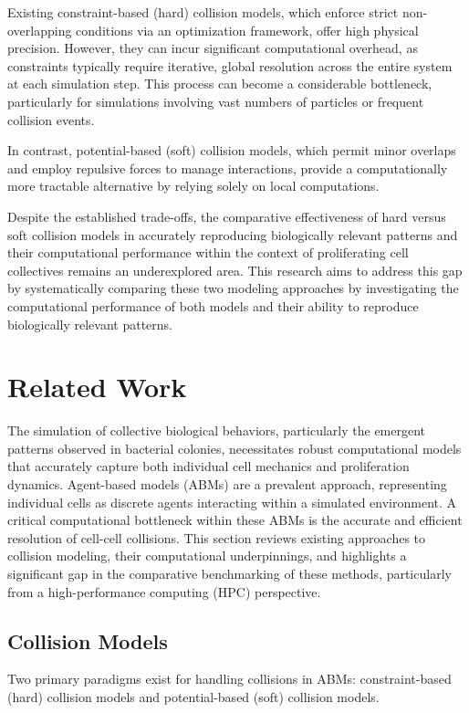 \documentclass[conference]{IEEEtran}
\begin{document}
Existing constraint-based (hard) collision models, which enforce strict non-overlapping conditions via an optimization framework, offer high physical precision. However, they can incur significant computational overhead, as constraints typically require iterative, global resolution across the entire system at each simulation step. This process can become a considerable bottleneck, particularly for simulations involving vast numbers of particles or frequent collision events.

In contrast, potential-based (soft) collision models, which permit minor overlaps and employ repulsive forces to manage interactions, provide a computationally more tractable alternative by relying solely on local computations.

Despite the established trade-offs, the comparative effectiveness of hard versus soft collision models in accurately reproducing biologically relevant patterns and their computational performance within the context of proliferating cell collectives remains an underexplored area. This research aims to address this gap by systematically comparing these two modeling approaches by investigating the computational performance of both models and their ability to reproduce biologically relevant patterns.


\section{Related Work}

The simulation of collective biological behaviors, particularly the emergent patterns observed in bacterial colonies, necessitates robust computational models that accurately capture both individual cell mechanics and proliferation dynamics. Agent-based models (ABMs) are a prevalent approach, representing individual cells as discrete agents interacting within a simulated environment. A critical computational bottleneck within these ABMs is the accurate and efficient resolution of cell-cell collisions. This section reviews existing approaches to collision modeling, their computational underpinnings, and highlights a significant gap in the comparative benchmarking of these methods, particularly from a high-performance computing (HPC) perspective.

\subsection{Collision Models}

Two primary paradigms exist for handling collisions in ABMs: constraint-based (hard) collision models and potential-based (soft) collision models.
\end{document}

